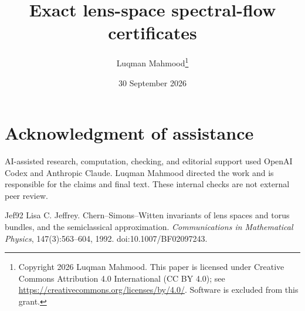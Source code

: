 \documentclass[11pt]{article}
\title{Exact lens-space spectral-flow certificates}
\author{Luqman Mahmood\thanks{Copyright 2026 Luqman Mahmood. This paper is licensed under Creative Commons Attribution 4.0 International (CC BY 4.0); see \url{https://creativecommons.org/licenses/by/4.0/}. Software is excluded from this grant.}}
\date{30 September 2026}
\begin{document}
\maketitle


\section*{Acknowledgment of assistance}
AI-assisted research, computation, checking, and editorial support used
OpenAI Codex and Anthropic Claude. Luqman Mahmood directed the work
and is responsible for the claims and final text. These internal
checks are not external peer review.

\begin{thebibliography}{Jef92}
Lisa C. Jeffrey.
\newblock Chern--Simons--Witten invariants of lens spaces and torus bundles,
  and the semiclassical approximation.
\newblock \emph{Communications in Mathematical Physics}, 147(3):563--604,
  1992.  doi:10.1007/BF02097243.
\end{thebibliography}
\end{document}
